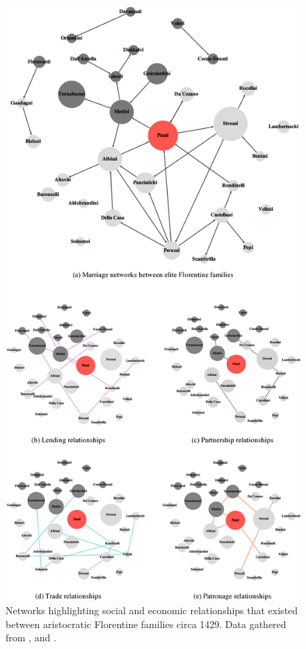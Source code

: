 \begin{figure}[h!]
\centering
\includegraphics[width=\textwidth,height=0.9\textheight,keepaspectratio]{Images/allnetworks.png}
\caption[Social and economic relationships between aristocratic Florentine families]{Networks highlighting social and economic relationships that existed between aristocratic Florentine families circa 1429. Data gathered from \citet{Kent1978}, \citet{Padgett1993} and \citet{Padgett1994}.}
\label{florentinenets}
\end{figure}


